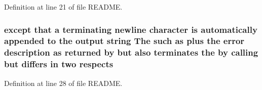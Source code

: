 Definition at line 21 of file R\-E\-A\-D\-M\-E.

\hypertarget{common_2README_a33a4706d30ee60d6fc7d0c4b387dc3b9}{
\subsubsection[{respects}]{\setlength{\rightskip}{0pt plus 5cm}except that a terminating newline character is automatically appended to {\bf the} output string The such as plus {\bf the} {\bf error} description as returned by but also terminates {\bf the} by calling but differs in two respects}}\label{common_2README_a33a4706d30ee60d6fc7d0c4b387dc3b9}


Definition at line 28 of file R\-E\-A\-D\-M\-E.

